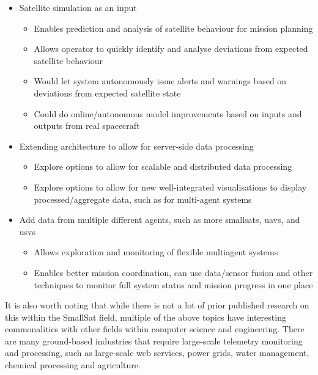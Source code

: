 \begin{itemize}
    \item Satellite simulation as an input
    \begin{itemize}
      \item Enables prediction and analysis of satellite behaviour for mission planning
      \item Allows operator to quickly identify and analyse deviations from expected satellite behaviour
      \item Would let system autonomously issue alerts and warnings based on deviations from expected satellite state
      \item Could do online/autonomous model improvements based on inputs and outputs from real spacecraft
    \end{itemize}
    \item Extending architecture to allow for server-side data processing
    \begin{itemize}
      \item Explore options to allow for scalable and distributed data processing
      \item Explore options to allow for new well-integrated visualisations to display processed/aggregate data, such as for multi-agent systems
    \end{itemize}
    \item Add data from multiple different agents, such as more \Gls{smallsat}s, \Gls{uav}s, and \Gls{usv}s
    \begin{itemize}
      \item Allows exploration and monitoring of flexible multiagent systems
      \item Enables better mission coordination, can use data/sensor fusion and other techniques to monitor full system status and mission progress in one place
    \end{itemize}
\end{itemize}

It is also worth noting that while there is not a lot of prior published research on this within the SmallSat field, multiple of the above topics have interesting commonalities with other fields within computer science and engineering. There are many ground-based industries that require large-scale telemetry monitoring and processing, such as large-scale web services, power grids, water management, chemical processing and agriculture.